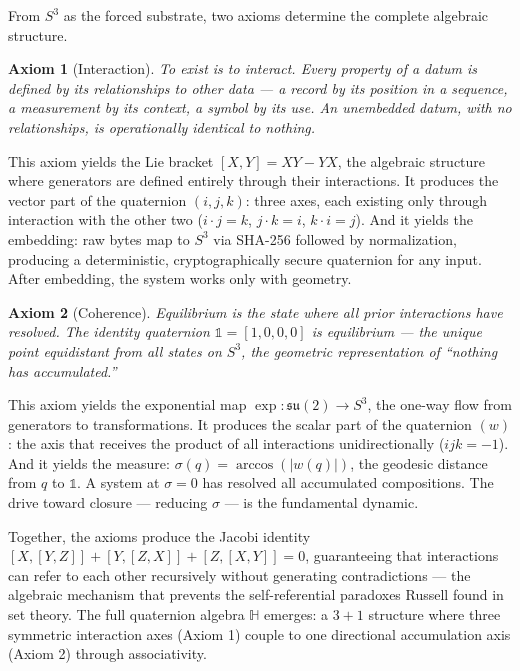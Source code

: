 \documentclass[12pt,a4paper]{article}
\newtheorem{axiom}{Axiom}
\begin{document}
From $S^3$ as the forced substrate, two axioms determine the complete algebraic structure.

\begin{axiom}[Interaction]
To exist is to interact. Every property of a datum is defined by its relationships to other data --- a record by its position in a sequence, a measurement by its context, a symbol by its use. An unembedded datum, with no relationships, is operationally identical to nothing.
\end{axiom}

This axiom yields the Lie bracket $[X, Y] = XY - YX$, the algebraic structure where generators are defined entirely through their interactions. It produces the vector part of the quaternion $(i, j, k)$: three axes, each existing only through interaction with the other two ($i \cdot j = k$, $j \cdot k = i$, $k \cdot i = j$). And it yields the embedding: raw bytes map to $S^3$ via SHA-256 followed by normalization, producing a deterministic, cryptographically secure quaternion for any input. After embedding, the system works only with geometry.

\begin{axiom}[Coherence]
Equilibrium is the state where all prior interactions have resolved. The identity quaternion $\mathbb{1} = [1, 0, 0, 0]$ is equilibrium --- the unique point equidistant from all states on $S^3$, the geometric representation of ``nothing has accumulated.''
\end{axiom}

This axiom yields the exponential map $\exp: \mathfrak{su}(2) \to S^3$, the one-way flow from generators to transformations. It produces the scalar part of the quaternion $(w)$: the axis that receives the product of all interactions unidirectionally ($ijk = -1$). And it yields the measure: $\sigma(q) = \arccos(|w(q)|)$, the geodesic distance from $q$ to $\mathbb{1}$. A system at $\sigma = 0$ has resolved all accumulated compositions. The drive toward closure --- reducing $\sigma$ --- is the fundamental dynamic.

Together, the axioms produce the Jacobi identity $[X,[Y,Z]] + [Y,[Z,X]] + [Z,[X,Y]] = 0$, guaranteeing that interactions can refer to each other recursively without generating contradictions --- the algebraic mechanism that prevents the self-referential paradoxes Russell found in set theory. The full quaternion algebra $\mathbb{H}$ emerges: a $3+1$ structure where three symmetric interaction axes (Axiom 1) couple to one directional accumulation axis (Axiom 2) through associativity.
\end{document}
